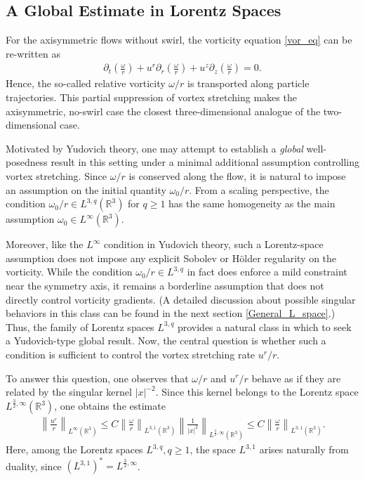 \documentclass[reqno,11pt]{amsart}
\begin{document}
\subsection{A Global Estimate in Lorentz Spaces}
For the axisymmetric flows without swirl, the vorticity equation \eqref{vor_eq} can be re-written as
    \begin{align}
    \label{eq:rel_vor_eq}
        \partial_t \left( \frac{\omega}{r} \right) 
    +
        u^r \partial_r \left( \frac{\omega}{r} \right)
    +
        u^z \partial_z \left( \frac{\omega}{r} \right)=0.
    \end{align}
Hence, the so-called relative vorticity $\omega/r$ is transported along particle trajectories. This partial suppression of vortex stretching makes the axisymmetric, no-swirl case the closest three-dimensional analogue of the two-dimensional case. 



Motivated by Yudovich theory, one may attempt to establish a \emph{global} well-posedness result in this setting under a minimal additional assumption controlling vortex stretching. Since $\omega/r$ is conserved along the flow, it is natural to impose an assumption on the initial quantity $\omega_0/r$. From a scaling perspective, the condition $\omega_0/r \in L^{3,q}(\mathbb{R}^3)$ for $q \ge 1$ has the same homogeneity as the main assumption $\omega_0 \in L^\infty(\mathbb{R}^3)$. 

Moreover, like the $L^\infty$ condition in Yudovich theory, such a Lorentz-space assumption does not impose any explicit Sobolev or H\"older regularity on the vorticity. While the condition $\omega_0/r\in L^{3,q}$ in fact does enforce a mild constraint near the symmetry axis, it remains a borderline assumption that does not directly control vorticity gradients. (A detailed discussion about possible singular behaviors in this class can be found in the next section \ref{General_L_space}.)
Thus, the family of Lorentz spaces $L^{3,q}$ provides a natural class in which to seek a Yudovich-type global result. Now, the central question is whether such a condition is sufficient to control the vortex stretching rate $u^r/r$.


To answer this question, one observes that $\omega/r$ and $u^r/r$ behave as if they are related by the singular kernel $|x|^{-2}$. Since this kernel belongs to the Lorentz space $L^{\frac{3}{2},\infty}(\mathbb{R}^3)$, one obtains the estimate
\begin{align}
\label{Danchin_est}
\left\| \frac{u^r}{r} \right\|_{L^\infty(\mathbb{R}^3)}
\le C
\left\| \frac{\omega}{r} \right\|_{L^{3,1}(\mathbb{R}^3)}
\left\| \frac{1}{|x|^2} \right\|_{L^{\frac{3}{2},\infty}(\mathbb{R}^3)}
\le C
\left\| \frac{\omega}{r} \right\|_{L^{3,1}(\mathbb{R}^3)}.
\end{align}
Here, among the Lorentz spaces $L^{3,q}, q\geq 1$, the space $L^{3,1}$ arises naturally from duality, since $(L^{3,1})^* = L^{\frac{3}{2},\infty}$.
\end{document}
